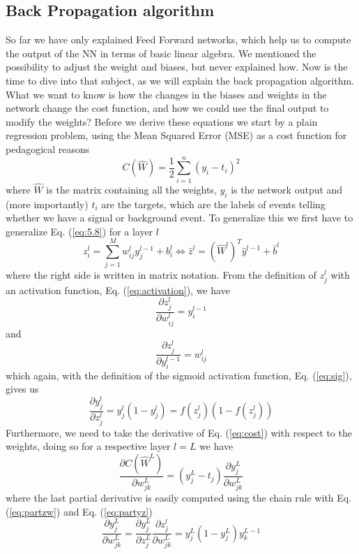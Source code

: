 \documentclass[12pt, a4paper]{book}
\begin{document}
\subsection{Back Propagation algorithm}
So far we have only explained Feed Forward networks, which help us to compute the output of the NN in terms of basic linear algebra. We mentioned the possibility to adjust the weight and biases, but never explained how. 
Now is the time to dive into that subject, as we will explain the back propagation algorithm. What we want to know is how the changes in the biases and weights in the network change the cost function, and how we could use the final 
output to modify the weights? Before we derive these equations we start by a plain regression problem, using the Mean Squared Error (MSE) as a cost function for pedagogical reasons
\begin{equation}\label{eq:cost}
    C(\hat{W})=\frac{1}{2}\sum_{i=1}^n(y_i-t_i)^2
\end{equation}
where $\hat{W}$ is the matrix containing all the weights, $y_i$ is the network output and (more importantly) $t_i$ are the targets, which are the labels of events telling whether we have a signal or background event. To generalize this we 
first have to generalize Eq. (\ref{eq:5.8}) for a layer $l$
$$
    z_i^l=\sum_{j=1}^Mw^l_{ij}y^{l-1}_j + b^l_i \Leftrightarrow \hat{z}^l=\left(\hat{W}^l\right)^T\hat{y}^{l-1} + \hat{b}^l
$$
where the right side is written in matrix notation. From the definition of $z_j^l$ with an activation function, Eq. (\ref{eq:activation}), we have
\begin{equation}\label{eq:partzw}
    \frac{\partial z_j^l}{\partial w_{ij}^l} = y_i^{l-1}
\end{equation}
and
$$
\frac{\partial z_j^l}{\partial y_i^{l-1}} = w_{ij}^l
$$
which again, with the definition of the sigmoid activation function, Eq. (\ref{eq:sig}), gives us
\begin{equation}\label{eq:partyz}
    \frac{\partial y^l_j}{\partial z_j^{l}} = y_j^l(1-y_j^l)=f(z_j^l)(1-f(z_j^l))
\end{equation}
Furthermore, we need to take the derivative of Eq. (\ref{eq:cost}) with respect to the weights, doing so for a respective layer $l=L$ we have
$$
    \frac{\partial C(\hat W ^L) }{\partial w_{jk}^L}=\left(y_j^L-t_j\right)\frac{\partial y_j^L}{\partial w_{jk}^L}
$$
where the last partial derivative is easily computed using the chain rule with Eq. (\ref{eq:partzw}) and Eq. (\ref{eq:partyz})
$$
\frac{\partial y_j^L}{\partial w_{jk}^L} = \frac{\partial y^L_j}{\partial z_j^{L}}\frac{\partial z_j^l}{\partial w_{jk}^L} = y_j^L(1-y_j^L)y_k^{L-1}
$$
\end{document}
